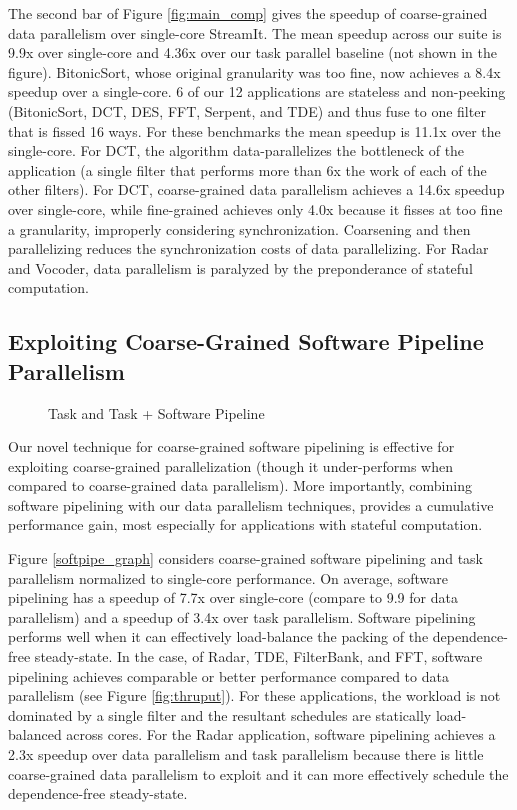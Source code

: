 The second bar of Figure \ref{fig:main_comp} gives the speedup of
coarse-grained data parallelism over single-core StreamIt. The mean
speedup across our suite is 9.9x over single-core and 4.36x over our
task parallel baseline (not shown in the figure).  BitonicSort, whose
original granularity was too fine, now achieves a 8.4x speedup over a
single-core. 6 of our 12 applications are stateless and non-peeking
(BitonicSort, DCT, DES, FFT, Serpent, and TDE) and thus fuse to one
filter that is fissed 16 ways.  For these benchmarks the mean speedup
is 11.1x over the single-core.  For DCT, the algorithm
data-parallelizes the bottleneck of the application (a single filter
that performs more than 6x the work of each of the other filters).
For DCT, coarse-grained data parallelism achieves a 14.6x speedup over
single-core, while fine-grained achieves only 4.0x because it fisses
at too fine a granularity, improperly considering synchronization.
Coarsening and then parallelizing reduces the synchronization costs of
data parallelizing.  For Radar and Vocoder, data parallelism is
paralyzed by the preponderance of stateful computation.

\subsection{Exploiting Coarse-Grained Software Pipeline Parallelism}

\begin{figure}[t]
\centering
{}
\caption{Task and Task + Software Pipeline
\protect\label{fig:softpipe_graph}}
\end{figure}
Our novel technique for coarse-grained software pipelining is
effective for exploiting coarse-grained parallelization (though it
under-performs when compared to coarse-grained data parallelism).
More importantly, combining software pipelining with our data
parallelism techniques, provides a cumulative performance gain,
most especially for applications with stateful computation.

Figure \ref{softpipe_graph} considers coarse-grained software
pipelining and task parallelism normalized to single-core performance.
On average, software pipelining has a speedup of 7.7x over single-core
(compare to 9.9 for data parallelism) and a speedup of 3.4x over task
parallelism. Software pipelining performs well when it can effectively
load-balance the packing of the dependence-free steady-state.  In the
case, of Radar, TDE, FilterBank, and FFT, software pipelining achieves
comparable or better performance compared to data parallelism (see
Figure \ref{fig:thruput}).  For these applications, the workload is
not dominated by a single filter and the resultant schedules are
statically load-balanced across cores.  For the Radar application,
software pipelining achieves a 2.3x speedup over data parallelism and
task parallelism because there is little coarse-grained data
parallelism to exploit and it can more effectively schedule the
dependence-free steady-state.

